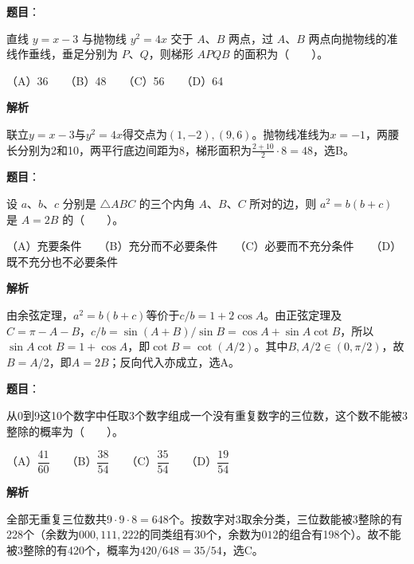 \begin{answer}

\textbf{题目}：

直线 $y=x-3$ 与抛物线 $y^2=4x$ 交于 $A\text{、}B$ 两点，过 $A\text{、}B$ 两点向抛物线的准线作垂线，垂足分别为 $P\text{、}Q$，则梯形 $APQB$ 的面积为\mbox{（　　）}。

（A）36　　（B）48　　（C）56　　（D）64

\textbf{解析}

联立$y=x-3$与$y^2=4x$得交点为$(1,-2),(9,6)$。抛物线准线为$x=-1$，两腰长分别为2和10，两平行底边间距为8，梯形面积为$\frac{2+10}{2}\cdot8=48$，选B。


\end{answer}
\begin{answer}

\textbf{题目}：

设 $a\text{、}b\text{、}c$ 分别是 $\triangle ABC$ 的三个内角 $A\text{、}B\text{、}C$ 所对的边，则 $a^2=b(b+c)$ 是 $A=2B$ 的\mbox{（　　）}。

（A）充要条件　　（B）充分而不必要条件　　（C）必要而不充分条件　　（D）既不充分也不必要条件

\textbf{解析}

由余弦定理，$a^2=b(b+c)$等价于$c/b=1+2\cos A$。由正弦定理及$C=\pi-A-B$，$c/b=\sin(A+B)/\sin B=\cos A+\sin A\cot B$，所以$\sin A\cot B=1+\cos A$，即$\cot B=\cot(A/2)$。其中$B,A/2\in(0,\pi/2)$，故$B=A/2$，即$A=2B$；反向代入亦成立，选A。


\end{answer}
\begin{answer}

\textbf{题目}：

从0到9这10个数字中任取3个数字组成一个没有重复数字的三位数，这个数不能被3整除的概率为\mbox{（　　）}。

（A）$\dfrac{41}{60}$　　（B）$\dfrac{38}{54}$　　（C）$\dfrac{35}{54}$　　（D）$\dfrac{19}{54}$

\textbf{解析}

全部无重复三位数共$9\cdot9\cdot8=648$个。按数字对3取余分类，三位数能被3整除的有228个（余数为$000,111,222$的同类组有30个，余数为$012$的组合有198个）。故不能被3整除的有420个，概率为$420/648=35/54$，选C。


\end{answer}
